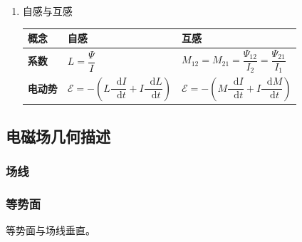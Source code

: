 \documentclass[UTF8,fontset=fandol,zihao=5]{ctexart}
\newcommand{\vect}[1]{\bm{#1}}
\newcommand{\dif}{\mathop{}\!\mathrm{d}}
\newcommand{\EE}{\mathcal{E}}
\begin{document}
\begin{enumerate}
\begin{enumerate}[label=(\arabic*)]
    \item 感生电动势
    
    产生原因为感生电场力，计算式为：

      \[
      \EE = - \oiint_S \frac{\partial \vect B}{\partial t} \cdot \dif \vect S
      \]

  \begin{methodbox}[【题型】感生电动势计算]
    感生电场径向电动势为零，故可以作辅助半径构建完整闭合回路，从而得出感生电动势。
  \end{methodbox}

  \begin{methodbox}
    注：当构建闭合回路时，要注意\textbf{算整个回路的感生电动势}！
  \end{methodbox}

  \end{enumerate}

  \item 自感与互感 

  \begin{center}
  \begin{tabularx}{0.98\textwidth}{>{\bfseries}p{1.5cm}X X}
  \toprule
  概念 & 自感 & 互感 \\
  \midrule
  系数 & $L=\dfrac{\varPsi}{I}$ & $M_{12} = M_{21} = \dfrac{\varPsi_{12}}{I_2} = \dfrac{\varPsi_{21}}{I_1} $ \\[6pt]
  电动势 & $\EE = - \left(L\dfrac{\dif I}{\dif t} + I\dfrac{\dif L}{\dif t}\right) $ & $ \EE = - \left(M\dfrac{\dif I}{\dif t} + I\dfrac{\dif M}{\dif t} \right) $ \\
  \bottomrule
  \end{tabularx}
  \end{center}

\end{enumerate}

\subsection{电磁场几何描述}

\subsubsection{场线}

\subsubsection{等势面}

\begin{methodbox}[等势面与场线关系]
  等势面与场线垂直。
\end{methodbox}
\end{document}
